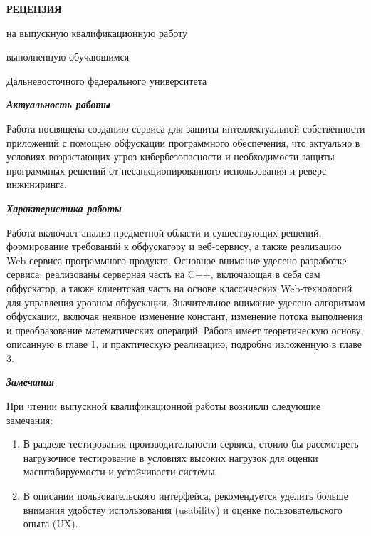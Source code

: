 \documentclass[12pt, a4paper, titlepage]{extarticle}
\begin{document}
	\drawtitle
	\pagestyle{empty}

	\vspace*{-10pt}

	\begin{center}

		\textbf{РЕЦЕНЗИЯ}

		\vspace*{-4pt}
		на выпускную квалификационную работу


		\vspace*{4pt}
		выполненную обучающимся 

		\vspace*{-4pt}
		Дальневосточного федерального университета

		\vspace{5pt}

	\end{center}

	\textbf{\textit{Актуальность работы}}

		Работа посвящена созданию сервиса для защиты интеллектуальной собственности приложений с помощью обфускации программного обеспечения, что актуально в условиях возрастающих угроз кибербезопасности и необходимости защиты программных решений от несанкционированного использования и реверс-инжиниринга.

	\textbf{\textit{Характеристика работы}}

		Работа включает анализ предметной области и существующих решений, формирование требований к обфускатору и веб-сервису, а также реализацию Web-сервиса программного продукта. Основное внимание уделено разработке сервиса: реализованы серверная часть на C++, включающая в себя сам обфускатор, а также клиентская часть на основе классических Web-технологий для управления уровнем обфускации. Значительное внимание уделено алгоритмам обфускации, включая неявное изменение констант, изменение потока выполнения и преобразование математических операций. Работа имеет теоретическую основу, описанную в главе 1, и практическую реализацию, подробно изложенную в главе 3.

	\textbf{\textit{Замечания}}

		При чтении выпускной квалификационной работы возникли следующие замечания:
		\begin{enumerate}
			\item В разделе тестирования производительности сервиса, стоило бы рассмотреть нагрузочное тестирование в условиях высоких нагрузок для оценки масштабируемости и устойчивости системы.

			\item В описании пользовательского интерфейса, рекомендуется уделить больше внимания удобству использования (usability) и оценке пользовательского опыта (UX).
		\end{enumerate}
\end{document}
